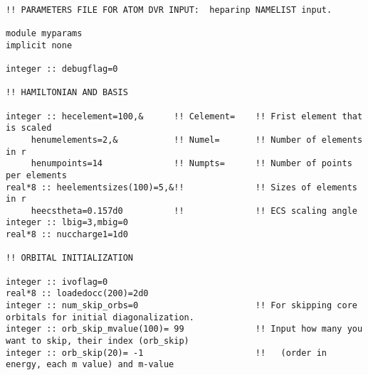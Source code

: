 \begin{verbatim}

!! PARAMETERS FILE FOR ATOM DVR INPUT:  heparinp NAMELIST input.

module myparams
implicit none

integer :: debugflag=0

!! HAMILTONIAN AND BASIS

integer :: hecelement=100,&      !! Celement=    !! Frist element that is scaled
     henumelements=2,&           !! Numel=       !! Number of elements in r
     henumpoints=14              !! Numpts=      !! Number of points per elements 
real*8 :: heelementsizes(100)=5,&!!              !! Sizes of elements in r
     heecstheta=0.157d0          !!              !! ECS scaling angle
integer :: lbig=3,mbig=0
real*8 :: nuccharge1=1d0

!! ORBITAL INITIALIZATION

integer :: ivoflag=0
real*8 :: loadedocc(200)=2d0
integer :: num_skip_orbs=0                       !! For skipping core orbitals for initial diagonalization.
integer :: orb_skip_mvalue(100)= 99              !! Input how many you want to skip, their index (orb_skip)
integer :: orb_skip(20)= -1                      !!   (order in energy, each m value) and m-value

\end{verbatim}
